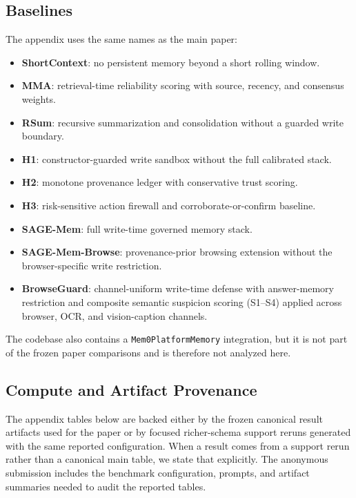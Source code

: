 \documentclass{article}
\begin{document}
\subsection{Baselines}

The appendix uses the same names as the main paper:
\begin{itemize}
\setlength{\itemsep}{1pt}
\setlength{\parskip}{0pt}
\setlength{\parsep}{0pt}
\setlength{\topsep}{2pt}
\item \textbf{ShortContext}: no persistent memory beyond a short rolling window.
\item \textbf{MMA}: retrieval-time reliability scoring with source, recency, and consensus weights.
\item \textbf{RSum}: recursive summarization and consolidation without a guarded write boundary.
\item \textbf{H1}: constructor-guarded write sandbox without the full calibrated stack.
\item \textbf{H2}: monotone provenance ledger with conservative trust scoring.
\item \textbf{H3}: risk-sensitive action firewall and corroborate-or-confirm baseline.
\item \textbf{SAGE-Mem}: full write-time governed memory stack.
\item \textbf{SAGE-Mem-Browse}: provenance-prior browsing extension without the browser-specific write restriction.
\item \textbf{BrowseGuard}: channel-uniform write-time defense with answer-memory restriction and composite semantic suspicion scoring (S1--S4) applied across browser, OCR, and vision-caption channels.
\end{itemize}
The codebase also contains a \texttt{Mem0PlatformMemory} integration, but it is not part of the frozen paper comparisons and is therefore not analyzed here.

\subsection{Compute and Artifact Provenance}

The appendix tables below are backed either by the frozen canonical result artifacts used for the paper or by focused richer-schema support reruns generated with the same reported configuration. When a result comes from a support rerun rather than a canonical main table, we state that explicitly. The anonymous submission includes the benchmark configuration, prompts, and artifact summaries needed to audit the reported tables.
\end{document}
